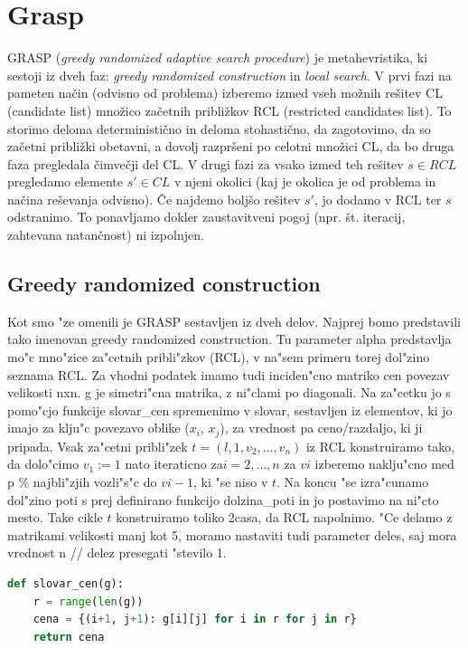 \documentclass[12pt,a4paper]{amsart}
\theoremstyle{definition} %
\theoremstyle{plain} %
\begin{document}
\section{Grasp} 

GRASP (\textit{greedy randomized adaptive search procedure}) je metahevristika, ki sestoji iz dveh faz: \textit{greedy randomized construction} in \textit{local search}.
V prvi fazi na pameten način (odvisno od problema) izberemo izmed vseh možnih rešitev CL (candidate list) množico začetnih približkov RCL (restricted candidates list). 
To storimo deloma deterministično in deloma stohastično, da zagotovimo, da so začetni približki obetavni, a dovolj razpršeni po celotni množici CL, da bo druga faza pregledala čimvečji del CL. 
V drugi fazi za vsako izmed teh rešitev $ s \in  RCL $ pregledamo elemente $s' \in CL$ v njeni okolici (kaj je okolica je od problema in načina reševanja odvisno). Če najdemo boljšo rešitev $s'$, 
jo dodamo v RCL ter $s$ odstranimo. To ponavljamo dokler zaustavitveni pogoj (npr. št. iteracij, zahtevana natančnost) ni izpolnjen.

\subsection{Greedy randomized construction} 

Kot smo "ze omenili je GRASP sestavljen iz dveh delov. Najprej bomo predstavili tako imenovan greedy randomized construction.
Tu parameter alpha predstavlja mo"c mno"zice za"cetnih pribli"zkov (RCL), v na"sem primeru torej dol"zino seznama RCL.
Za vhodni podatek imamo tudi inciden"cno matriko cen povezav velikosti nxn. g je simetri"cna matrika, z ni"clami po diagonali.
Na za"cetku jo s pomo"cjo funkcije slovar\_cen spremenimo v slovar, sestavljen iz elementov, ki jo imajo za klju"c povezavo oblike ($x_{i}$, $x_{j}$), za vrednost pa ceno/razdaljo, ki ji pripada. Vsak za"cetni pribli"zek $t = (l,1,v_{2}, \dots,v_{n})$ iz RCL konstruiramo tako, da dolo"cimo $v_{1} := 1$ nato iteraticno za$ i = 2, \dots,n$ za $v{i}$ izberemo naklju"cno med p \% najbli"zjih vozli"s"c do $v{i-1}$, ki "se niso v  $t$. Na koncu "se izra"cunamo dol"zino poti s prej definirano funkcijo dolzina\_poti in jo postavimo na ni"cto mesto. Take cikle $t$ konstruiramo toliko 2casa, da RCL napolnimo. "Ce delamo z matrikami velikosti manj kot 5, moramo nastaviti tudi parameter deles, saj mora vrednost n // delez presegati "stevilo 1.  

\begin{lstlisting}[language=Python]
def slovar_cen(g):
    r = range(len(g))
    cena = {(i+1, j+1): g[i][j] for i in r for j in r}
    return cena
\end{lstlisting}
\end{document}
